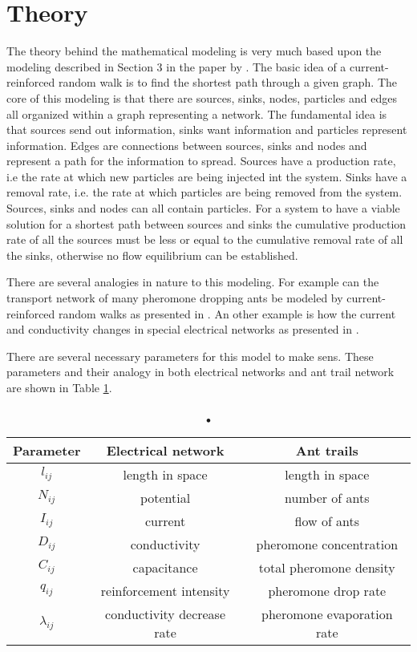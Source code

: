 \section{Theory}
\label{sec:theory}
The theory behind the mathematical modeling is very much based upon the modeling described in Section 3 in the paper by \cite{Current}. The basic idea of a current-reinforced random walk is to find the shortest path through a given graph. The core of this modeling is that there are sources, sinks, nodes, particles and edges all organized within a graph representing a network. The fundamental idea is that sources send out information, sinks want information and particles represent information. Edges are connections between sources, sinks and nodes and represent a path for the information to spread. Sources have a production rate, i.e the rate at which new particles are being injected int the system. Sinks have a removal rate, i.e. the rate at which particles are being removed from the system. Sources, sinks and nodes can all contain particles. For a system to have a viable solution for a shortest path between sources and sinks the cumulative production rate of all the sources  must be less or equal to the cumulative removal rate of all the sinks, otherwise no flow equilibrium can be established.

There are several analogies in nature to this modeling. For example can the transport network of many pheromone dropping ants be modeled by current-reinforced random walks as presented in \cite{Schweitzer1997153}. An other example is how the current and conductivity changes in special electrical networks as presented in \cite{Doyle}. 

There are several necessary parameters for this model to make sens. These parameters and their analogy in both electrical networks and ant trail network are shown in Table \ref{tab:parameters}.
\begin{table}
\centering
\caption{•}
\label{tab:parameters}
\begin{tabular}{ c | c | c }                       
	\textbf{Parameter} & \textbf{Electrical network} & \textbf{Ant trails} \\
	\hline
	$l_{ij}$ & length in space & length in space \\
	\hline
	$N_{ij}$ & potential & number of ants \\
	\hline
	$I_{ij}$ & current & flow of ants \\
	\hline
	$D_{ij}$ & conductivity & pheromone concentration \\
	\hline
	$C_{ij}$ & capacitance & total pheromone density \\
	\hline
	$q_{ij}$ & reinforcement intensity & pheromone drop rate \\
	\hline
	$\lambda_{ij}$ & conductivity decrease rate & pheromone evaporation rate \\
\end{tabular} 
\end{table}


